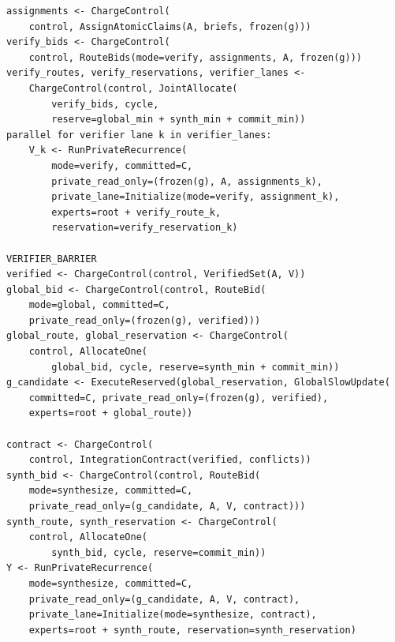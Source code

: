 \documentclass[10pt,a4paper]{article}
\begin{document}
\begin{lstlisting}[caption={Barrier-mediated verification, synthesis, and atomic commitment.},label={lst:verify}]
assignments <- ChargeControl(
    control, AssignAtomicClaims(A, briefs, frozen(g)))
verify_bids <- ChargeControl(
    control, RouteBids(mode=verify, assignments, A, frozen(g)))
verify_routes, verify_reservations, verifier_lanes <-
    ChargeControl(control, JointAllocate(
        verify_bids, cycle,
        reserve=global_min + synth_min + commit_min))
parallel for verifier lane k in verifier_lanes:
    V_k <- RunPrivateRecurrence(
        mode=verify, committed=C,
        private_read_only=(frozen(g), A, assignments_k),
        private_lane=Initialize(mode=verify, assignment_k),
        experts=root + verify_route_k,
        reservation=verify_reservation_k)

VERIFIER_BARRIER
verified <- ChargeControl(control, VerifiedSet(A, V))
global_bid <- ChargeControl(control, RouteBid(
    mode=global, committed=C,
    private_read_only=(frozen(g), verified)))
global_route, global_reservation <- ChargeControl(
    control, AllocateOne(
        global_bid, cycle, reserve=synth_min + commit_min))
g_candidate <- ExecuteReserved(global_reservation, GlobalSlowUpdate(
    committed=C, private_read_only=(frozen(g), verified),
    experts=root + global_route))

contract <- ChargeControl(
    control, IntegrationContract(verified, conflicts))
synth_bid <- ChargeControl(control, RouteBid(
    mode=synthesize, committed=C,
    private_read_only=(g_candidate, A, V, contract)))
synth_route, synth_reservation <- ChargeControl(
    control, AllocateOne(
        synth_bid, cycle, reserve=commit_min))
Y <- RunPrivateRecurrence(
    mode=synthesize, committed=C,
    private_read_only=(g_candidate, A, V, contract),
    private_lane=Initialize(mode=synthesize, contract),
    experts=root + synth_route, reservation=synth_reservation)


\end{lstlisting}
\end{document}
